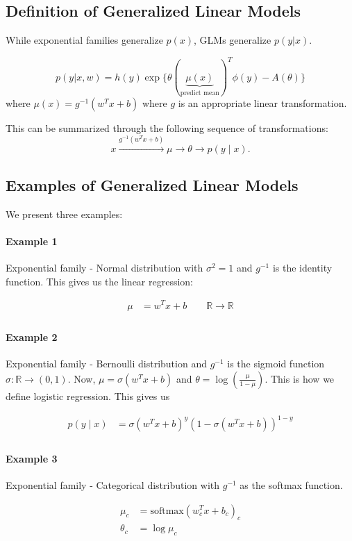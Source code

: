 \documentclass{article}
\begin{document}
\subsection{Definition of Generalized Linear Models}

While exponential families generalize $p(x)$, GLMs generalize $p(y|x)$.

\[
p(y | x,w) = h(y)\exp\{\theta(\underbrace{\mu(x)}_{\text{predict mean}})^T\phi(y) - A(\theta)\}
\]
where $\mu(x) = g^{-1}(w^Tx + b)$
where $g$ is an appropriate linear transformation.

This can be summarized through the following sequence of transformations:
$$
x \overset{g^{-1}(w^T x + b)}{\longrightarrow} \mu \to \theta \to p(y \mid x).
$$

\subsection{Examples of Generalized Linear Models}
We present three examples:
\paragraph{Example 1} Exponential family - Normal distribution with $\sigma^2 = 1$ and $g^{-1}$ is the identity function.
This gives us the linear regression:

\begin{align*}
\mu &= w^Tx + b \qquad \mathbb{R} \to \mathbb{R} \\
\end{align*}

\paragraph{Example 2} Exponential family - Bernoulli distribution and $g^{-1}$ is the sigmoid function $\sigma: \mathbb{R} \rightarrow (0, 1)$.
Now, $\mu = \sigma(w^Tx + b)$ and $\theta = \log \left(\frac{\mu }{1 - \mu}\right)$. This is how we define logistic regression. This gives us

\begin{align*}
p(y \mid x) &= \sigma(w^Tx + b)^y(1 - \sigma(w^Tx + b))^{1-y} \\
\end{align*}

\paragraph{Example 3} Exponential family - Categorical distribution with $g^{-1}$ as the softmax function.

\begin{align*}
\mu_c &= \text{softmax}(w_c^T x + b_c)_c \\
\theta_c &= \log \mu_c \\
\end{align*}
\end{document}

